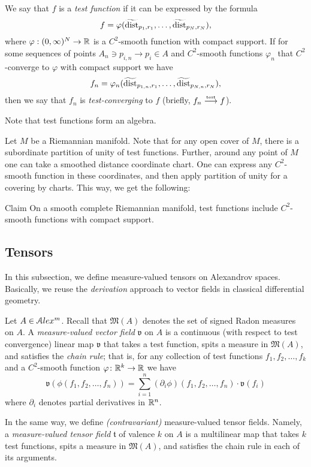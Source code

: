 We say that $f$ is a \emph{test function} if it can be expressed by the formula
$$f=\varphi( \widetilde{\operatorname{\rm dist}}_{p_1,r_1}, \dots,   \widetilde{\operatorname{\rm dist}}_{p_N,r_N}),$$
where $\varphi:(0,\infty)^N\to\mathbb{R}$ is a $C^2$-smooth function with compact support.
If for some sequences of points $A_n\ni p_{i,n}\to p_i\in A$ and $C^2$-smooth functions $\varphi_n$ that $C^2$-converge to $\varphi$ with compact support we have
$$f_n=\varphi_n( \widetilde{\operatorname{\rm dist}}_{p_{1,n},r_1},\dots,   \widetilde{\operatorname{\rm dist}}_{p_{N,n},r_N}),$$
then we say that $f_n$ is \emph{test-converging} to $f$ (briefly, $f_n\stackrel{\text{\tiny\rm test}}{\longrightarrow} f$).

Note that test functions form an algebra.

Let $M$ be a Riemannian manifold.
Note that for any open cover of $M$, there is a subordinate partition of unity of test functions.
Further, around any point of $M$ one can take a smoothed distance 
coordinate chart.
One can express any $C^2$-smooth function in these 
coordinates, and then apply partition of unity for a covering by charts.
This way, we get the following:

\begin{thm}{Claim}
On a smooth complete Riemannian manifold, test functions
include $C^2$-smooth functions with compact support.
\end{thm}
 
\subsection{Tensors}

In this subsection, we define measure-valued tensors on Alexandrov spaces.
Basically, we reuse the \emph{derivation} approach to vector fields in classical differential geometry. 

Let $A\in \mathcal{A}lex^m$.
Recall that $\mathfrak M(A)$
denotes the set of signed Radon measures on $A$.
A \emph{measure-valued vector field} $\mathfrak{v}$  on $A$
is a  continuous (with respect to test convergence) linear map
$\mathfrak{v}$ that takes a test function,
spits a measure in $\mathfrak M(A)$,
and satisfies the \emph{chain rule};
that is, for any collection of test functions $f_1,f_2,\dots,f_k$
and a $C^2$-smooth function $\varphi\colon\mathbb{R}^k\to\mathbb{R}$ we have
$$\mathfrak{v}(\phi(f_1,f_2,\dots,f_n))
=
\sum_{i=1}^n (\partial_i\phi)(f_1,f_2,\dots,f_n)\cdot\mathfrak{v}(f_i)$$
where $\partial_i$ denotes partial derivatives in $\mathbb{R}^n$.

In the same way, we define \emph{(contravariant)} measure-valued tensor fields.
Namely, a \emph{measure-valued tensor field} $\mathfrak{t}$ of valence $k$ on $A$ is a multilinear map that takes $k$ test functions, spits a measure in $\mathfrak M(A)$, and satisfies the chain rule in each of its arguments.


